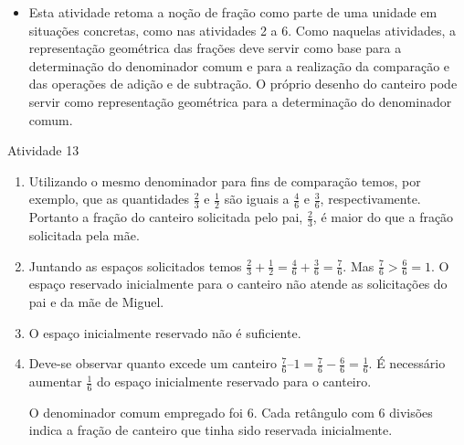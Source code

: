 \begin{multicols}{2}
  \begin{itemize} %
    \item       Esta atividade retoma a noção de fração como parte de uma unidade em situações concretas, como nas atividades 2 a 6. Como naquelas atividades, a representação geométrica das frações deve servir como base para a determinação do denominador comum e para a realização da comparação e das operações de adição e de subtração. O próprio desenho do canteiro pode servir como representação geométrica para a determinação do denominador comum.
\end{itemize} %

\begin{resposta*}{Atividade 13}
\begin{enumerate} [\quad a)] %
  \item     Utilizando o mesmo denominador para fins de comparação temos, por exemplo, que as quantidades     $\frac{2}{3}$     e     $\frac{1}{2}$     são iguais a     $\frac{4}{6}$     e     $\frac{3}{6}$, respectivamente. Portanto a fração do canteiro solicitada pelo pai,     $\frac{2}{3}$, é maior do que a fração solicitada pela mãe.
  \item     Juntando as espaços solicitados temos     $\frac{2}{3} + \frac{1}{2} = \frac{4}{6} + \frac{3}{6} = \frac{7}{6}$. Mas     $\frac{7}{6}>\frac{6}{6}=1$. O espaço reservado inicialmente para o canteiro não atende as solicitações do pai e da mãe de Miguel.
  \newpage
  \item     O espaço inicialmente reservado não é suficiente.
  \item     Deve-se observar quanto excede um canteiro  $\frac{7}{6} – 1 = \frac{7}{6} - \frac{6}{6} = \frac{1}{6}$. É necessário aumentar $\frac{1}{6}$ do espaço inicialmente reservado para o canteiro.

O denominador comum empregado foi 6. Cada retângulo com 6 divisões indica a fração de canteiro que tinha sido reservada inicialmente.

\begin{center}
\end{center}


\end{enumerate} %

\end{resposta*}
\end{multicols}

